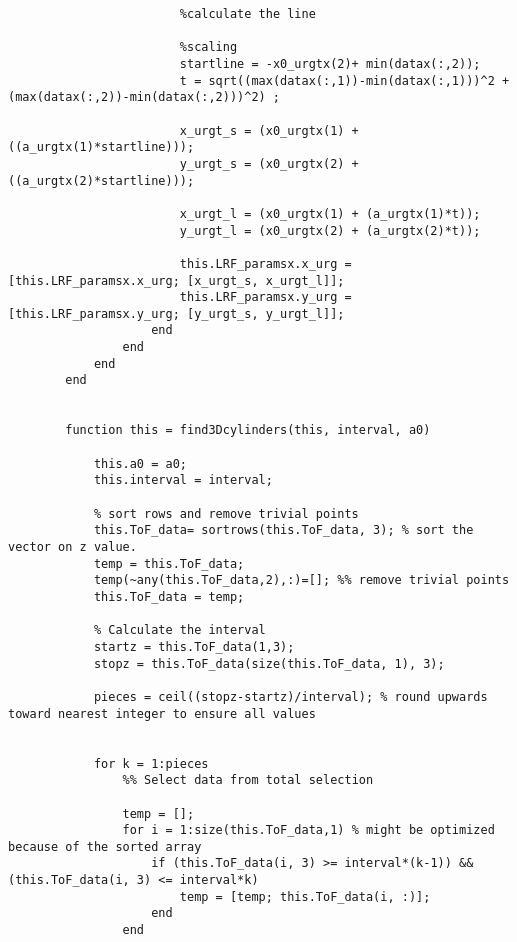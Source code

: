 \begin{lstlisting}
                        %calculate the line
                        
                        %scaling
                        startline = -x0_urgtx(2)+ min(datax(:,2));
                        t = sqrt((max(datax(:,1))-min(datax(:,1)))^2 + (max(datax(:,2))-min(datax(:,2)))^2) ;
                        
                        x_urgt_s = (x0_urgtx(1) + ((a_urgtx(1)*startline)));
                        y_urgt_s = (x0_urgtx(2) + ((a_urgtx(2)*startline)));
                        
                        x_urgt_l = (x0_urgtx(1) + (a_urgtx(1)*t));
                        y_urgt_l = (x0_urgtx(2) + (a_urgtx(2)*t));
                        
                        this.LRF_paramsx.x_urg = [this.LRF_paramsx.x_urg; [x_urgt_s, x_urgt_l]];
                        this.LRF_paramsx.y_urg = [this.LRF_paramsx.y_urg; [y_urgt_s, y_urgt_l]];
                    end
                end
            end
        end
        
        
        function this = find3Dcylinders(this, interval, a0)
 
            this.a0 = a0;
            this.interval = interval;
            
            % sort rows and remove trivial points
            this.ToF_data= sortrows(this.ToF_data, 3); % sort the vector on z value.
            temp = this.ToF_data;
            temp(~any(this.ToF_data,2),:)=[]; %% remove trivial points
            this.ToF_data = temp;
            
            % Calculate the interval
            startz = this.ToF_data(1,3);
            stopz = this.ToF_data(size(this.ToF_data, 1), 3);
            
            pieces = ceil((stopz-startz)/interval); % round upwards toward nearest integer to ensure all values
            
            
            for k = 1:pieces
                %% Select data from total selection
                
                temp = [];
                for i = 1:size(this.ToF_data,1) % might be optimized because of the sorted array
                    if (this.ToF_data(i, 3) >= interval*(k-1)) && (this.ToF_data(i, 3) <= interval*k)
                        temp = [temp; this.ToF_data(i, :)];
                    end
                end
                
                
                

\end{lstlisting}
